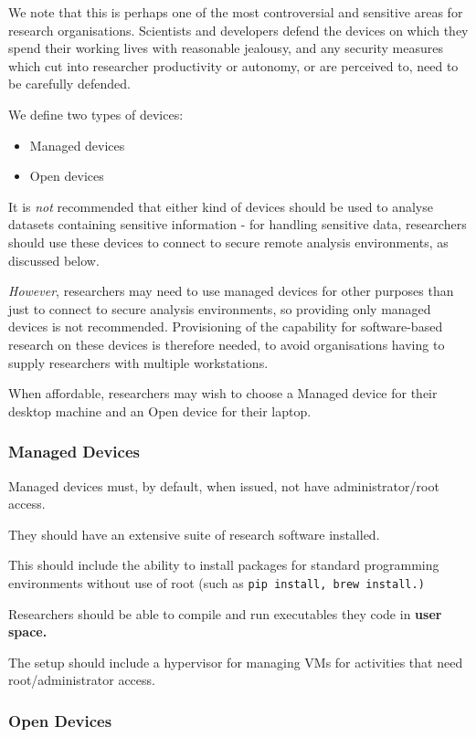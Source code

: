 \documentclass[10pt,a4paper,twocolumn]{article}
\begin{document}
We note that this is perhaps one of the most controversial and sensitive areas for research organisations.
Scientists and developers defend the devices on which they spend their working lives with reasonable jealousy, and any security measures which cut into researcher productivity or autonomy, or are perceived to, need to be carefully defended.

We define two types of devices: 

\begin{itemize}
    \item Managed devices
    \item Open devices
\end{itemize} 

It is \emph{not} recommended that either kind of 
devices should be used to analyse datasets containing sensitive information
- for handling sensitive data, researchers should use these devices to connect to secure remote analysis environments, as discussed below.

\emph{However}, researchers may need to use managed devices for other purposes than just to connect to secure analysis environments, so providing only managed devices is not recommended.
Provisioning of the capability for software-based research on these devices is therefore needed, to avoid organisations having to supply researchers with multiple workstations.

When affordable, researchers may wish to choose a Managed device for their desktop machine and an Open device for their laptop.

\subsubsection{Managed Devices}

Managed devices must, by default, when issued, not have administrator/root access.

They should have an extensive suite of research software installed.

This should include the ability to install packages for standard programming environments without use of root (such as \verb|pip install, brew install.)|

Researchers should be able to compile and run executables they code in \textbf{user space.}

The setup should include a hypervisor for managing VMs for activities that need root/administrator access.

\subsubsection{Open Devices}
\end{document}
